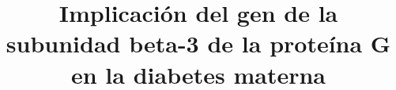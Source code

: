 \documentclass{bmcart}
\begin{document}
	\begin{frontmatter}
	
		\begin{fmbox}
			
			
			\title{Implicación del gen de la subunidad beta-3 de la proteína G en la diabetes materna}
			
			
			\author[
			  addressref={aff1},                   %
			  corref={aff1},                       %
			  email={victorgo@uma.es}   %
			]{ } %
			\author[
			  addressref={aff2},
			  email={susanafernandez@uma.es}
			]{ }
			\author[
			addressref={aff3},
			email={pablobermudezgamez@uma.es}
			]{ }
			\author[
			addressref={aff4},
			email={juancavergara6@uma.es}
			]{ }
			
			
			\address[id=aff1]{%
			  ,             %
			  ,          %
			  ,                              %
			}
		
		\end{fmbox}%
		
		\begin{abstractbox}
		
			\begin{abstract} %
			

\end{abstract}
\end{abstractbox}
\end{frontmatter}
\end{document}
